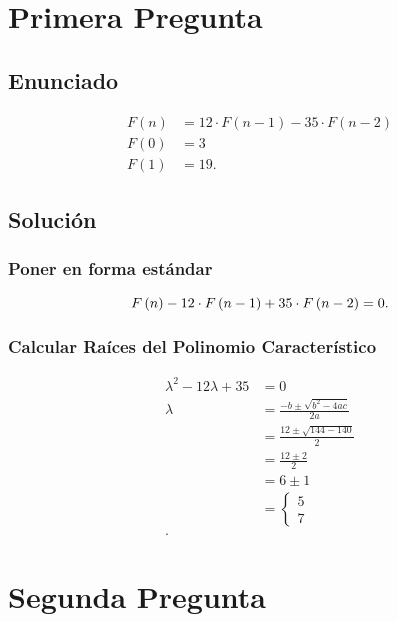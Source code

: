 


    

    \section*{Primera Pregunta}
    \subsection*{Enunciado}
    \begin{align*}
      F\left( n \right) &= 12\cdot F\left( n - 1 \right) - 35 \cdot F\left( n - 2 \right)\\
      F\left( 0 \right) &= 3\\
      F\left( 1 \right) &= 19
    .\end{align*}
    \subsection*{Solución}

    \subsubsection*{Poner en forma estándar}
    \[
    F\left( n \right) - 12\cdot F\left( n - 1 \right) + 35\cdot F\left( n - 2 \right)  = 0\\
    .\] 

    \subsubsection*{Calcular Raíces del Polinomio Característico}
    \begin{align*}
      \lambda^2 - 12 \lambda + 35 &= 0\\
      \lambda &= \frac{-b \pm \sqrt{b^2 - 4ac} }{2a} \\
      &= \frac{12 \pm \sqrt{144 - 140 } }{2} \\
      &= \frac{12 \pm 2}{2} \\
      &= 6 \pm 1 \\
      &= \begin{cases}
        5 \\
	7
      \end{cases}  \\
    .\end{align*}


    \section*{Segunda Pregunta}

